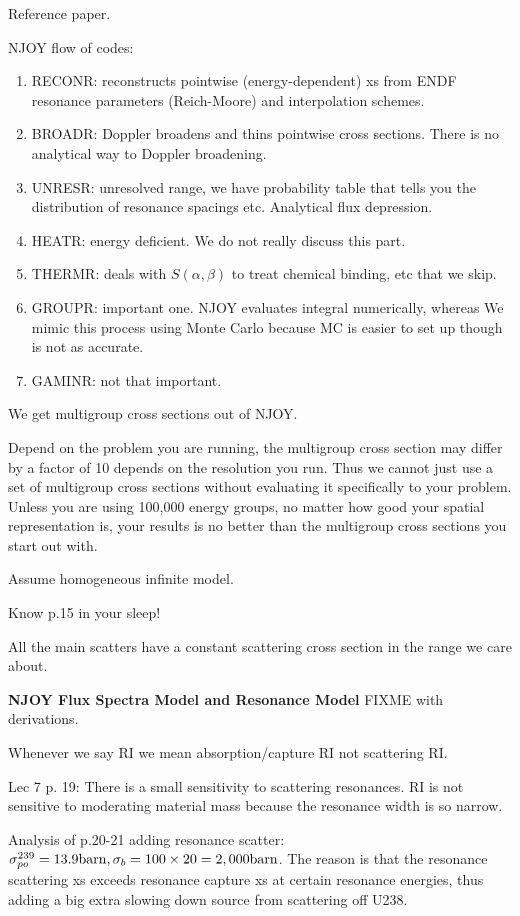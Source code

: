\documentclass{school-22.211-notes}
\date{February 27, 2012}
\begin{document}
\maketitle

Reference paper. 

NJOY flow of codes:
\begin{enumerate}
\item RECONR: reconstructs pointwise (energy-dependent) xs from ENDF resonance parameters (Reich-Moore) and interpolation schemes. 
\item BROADR: Doppler broadens and thins pointwise cross sections. There is no analytical way to Doppler broadening. 
\item UNRESR: unresolved range, we have probability table that tells you the distribution of resonance spacings etc. Analytical flux depression. 
\item HEATR: energy deficient. We do not really discuss this part. 
\item THERMR: deals with $S(\alpha, \beta)$ to treat chemical binding, etc that we skip.
\item GROUPR: important one. NJOY evaluates integral numerically, whereas We mimic this process using Monte Carlo because MC is easier to set up though is not as accurate. 
\item GAMINR: not that important. 
\end{enumerate}
We get multigroup cross sections out of NJOY. 


Depend on the problem you are running, the multigroup cross section may differ by a factor of 10 depends on the resolution you run. Thus we cannot just use a set of multigroup cross sections without evaluating it specifically to your problem. Unless you are using 100,000 energy groups, no matter how good your spatial representation is, your results is no better than the multigroup cross sections you start out with. 


Assume homogeneous infinite model. 

Know p.15 in your sleep! 

All the main scatters have a constant scattering cross section in the range we care about. 


\clearpage
\textbf{NJOY Flux Spectra Model and Resonance Model}
FIXME with derivations. 


Whenever we say RI we mean absorption/capture RI not scattering RI. 


Lec 7 p. 19: There is a small sensitivity to scattering resonances. 
RI is not sensitive to moderating material mass because the resonance width is so narrow. 

Analysis of p.20-21 adding resonance scatter: $\sigma_{po}^{239} = 13.9 \mathrm{barn}, \sigma_b = 100 \times 20 = 2,000 \mathrm{barn}$. The reason is that the resonance scattering xs exceeds resonance capture xs at certain resonance energies, thus adding a big extra slowing down source from scattering off U238. 










\clearpage
\end{document}
